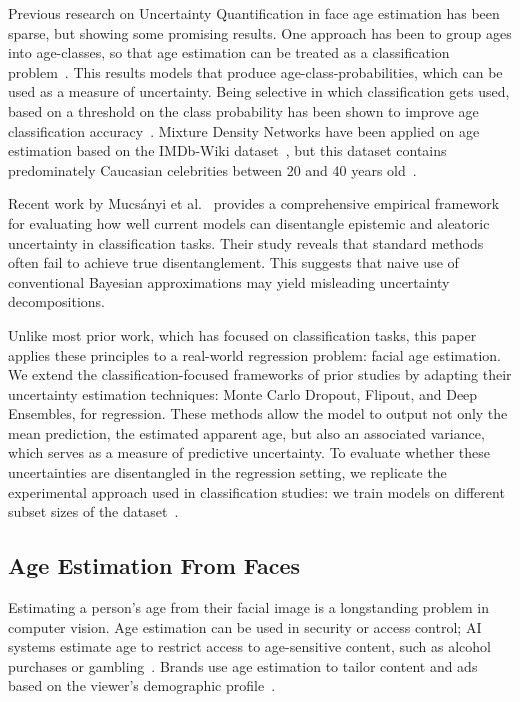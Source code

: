 \documentclass[runningheads]{llncs}
\begin{document}
Previous research on Uncertainty Quantification in face age estimation has been sparse, but showing some promising results. One approach has been to group ages into age-classes, so that age estimation can be treated as a classification problem~\cite{terhorst2019reliable}. This results models that produce age-class-probabilities, which can be used as a measure of uncertainty. Being selective in which classification gets used, based on a threshold on the class probability has been shown to improve age classification accuracy~\cite{terhorst2019reliable}. Mixture Density Networks have been applied on age estimation based on the IMDb-Wiki dataset~\cite{rothe2015dex}, but this dataset contains predominately Caucasian celebrities between 20 and 40 years old~\cite{terhorst2019reliable}.

Recent work by Mucs\'anyi et al.~\cite{mucsanyi2024benchmarking} provides a comprehensive empirical framework for evaluating how well current models can disentangle epistemic and aleatoric uncertainty in classification tasks. Their study reveals that standard methods often fail to achieve true disentanglement. This suggests that naive use of conventional Bayesian approximations may yield misleading uncertainty decompositions.

Unlike most prior work, which has focused on classification tasks, this paper applies these principles to a real-world regression problem: facial age estimation. We extend the classification-focused frameworks of prior studies by adapting their uncertainty estimation techniques: Monte Carlo Dropout, Flipout, and Deep Ensembles, for regression. These methods allow the model to output not only the mean prediction, the estimated apparent age, but also an associated variance, which serves as a measure of predictive uncertainty. To evaluate whether these uncertainties are disentangled in the regression setting, we replicate the experimental approach used in classification studies: we train models on different subset sizes of the dataset~\cite{dejong2025measuring}.

\subsection{Age Estimation From Faces}

Estimating a person's age from their facial image is a longstanding problem in computer vision. Age estimation can be used in security or access control; AI systems estimate age to restrict access to age-sensitive content, such as alcohol purchases or gambling~\cite{burgess2021ai}. Brands use age estimation to tailor content and ads based on the viewer's demographic profile~\cite{burt2023anonymized,gollapalli2023machine}.
\end{document}
